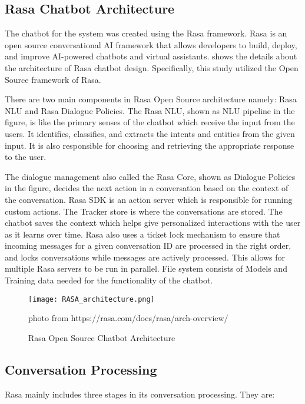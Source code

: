 \subsection{Rasa Chatbot Architecture}

The chatbot for the system was created using the Rasa framework. Rasa is an open source conversational AI framework that allows developers to build, deploy, and improve AI-powered chatbots and virtual assistants.  shows the details about the architecture of Rasa chatbot design. Specifically, this study utilized the Open Source framework of Rasa.

There are two main components in Rasa Open Source architecture namely: Rasa NLU and Rasa Dialogue Policies. The Rasa NLU, shown as NLU pipeline in the figure, is like the primary senses of the chatbot which receive the input from the users. It identifies, classifies, and extracts the intents and entities from the given input. It is also responsible for choosing and retrieving the appropriate response to the user. 

The dialogue management also called the Rasa Core, shown as Dialogue Policies in the figure, decides the next action in a conversation based on the context of the conversation. Rasa SDK is an action server which is responsible for running custom actions. The Tracker store is where the conversations are stored. The chatbot saves the context which helps give personalized interactions with the user as it learns over time. Rasa also uses a ticket lock mechanism to ensure that incoming messages for a given conversation ID are processed in the right order, and locks conversations while messages are actively processed. This allows for multiple Rasa servers to be run in parallel. File system consists of Models and Training data needed for the functionality of the chatbot.

\newpage

\begin{figure}[h]
	\centering 
	\texttt{[image: RASA\_architecture.png]}
	\caption{Rasa Open Source Chatbot Architecture}
	photo from https://rasa.com/docs/rasa/arch-overview/
	\label{fig:rasa_architecture}
\end{figure}

\subsection {Conversation Processing}

Rasa mainly includes three stages in its conversation processing. They are:

